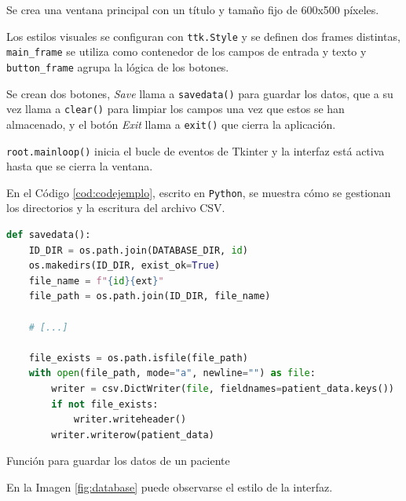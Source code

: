 Se crea una ventana principal con un título y tamaño fijo de 600x500 píxeles.

Los estilos visuales se configuran con \verb|ttk.Style| y se definen dos frames distintas, \verb|main_frame| se utiliza como contenedor de los campos de entrada y texto y \verb|button_frame| agrupa la lógica de los botones.

Se crean dos botones, \textit{Save} llama a \verb|savedata()| para guardar los datos, que a su vez llama a \verb|clear()| para limpiar los campos una vez que estos se han almacenado, y el botón \textit{Exit} llama a \verb|exit()| que cierra la aplicación.

\verb|root.mainloop()| inicia el bucle de eventos de Tkinter y la interfaz está activa hasta que se cierra la ventana.

En el Código \ref{cod:codejemplo}, escrito en \texttt{Python}, se muestra cómo se gestionan los directorios y la escritura del archivo CSV.

\begin{code}[h]
\begin{lstlisting}[language=Python]
def savedata():
    ID_DIR = os.path.join(DATABASE_DIR, id)
    os.makedirs(ID_DIR, exist_ok=True)
    file_name = f"{id}{ext}"
    file_path = os.path.join(ID_DIR, file_name)

    # [...]

    file_exists = os.path.isfile(file_path)
    with open(file_path, mode="a", newline="") as file:
        writer = csv.DictWriter(file, fieldnames=patient_data.keys())
        if not file_exists:
            writer.writeheader()
        writer.writerow(patient_data)
\end{lstlisting}
\caption[Función para guardar los datos de un paciente]{Función para guardar los datos de un paciente}
\label{cod:codejemplo}
\end{code}

En la Imagen \ref{fig:database} puede observarse el estilo de la interfaz.

